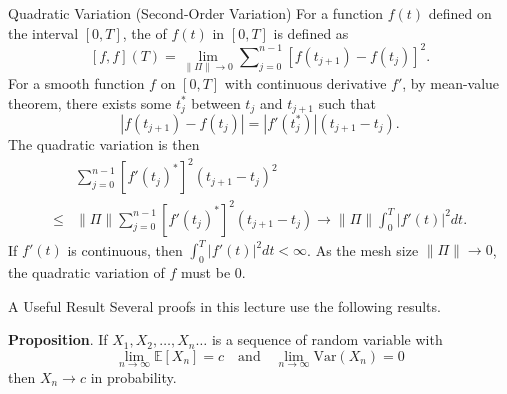 \documentclass[letterpaper,handout]{beamer}
\def\Sum{\sum\nolimits}
\def\E{\mathbb E}
\def\V{\mathrm{Var}}
\begin{document}


\begin{frame}{Quadratic Variation (Second-Order Variation)}
For a function $f(t)$ defined on the interval $[0,T]$, the  of $f(t)$ in $[0,T]$ is defined as
$$[f,f](T)=\lim_{\|\Pi\|\to 0}\Sum_{j=0}^{n-1}[f(t_{j+1})-f(t_j)]^2.$$
For a smooth function $f$ on $[0, T]$ with continuous derivative $f'$,
by mean-value theorem, there exists
some $t_j^*$ between $t_j$ and $t_{j+1}$ such that
$$|f(t_{j+1})-f(t_j)|= |f'(t_j^*)|(t_{j+1}-t_j).$$
The quadratic variation is then
\begin{align*}
&\Sum_{j=0}^{n-1}[f'(t_j)^*]^2(t_{j+1}-t_j)^2\\
\le{}& \|\Pi\|\Sum_{j=0}^{n-1}[f'(t_j)^*]^2(t_{j+1}-t_j)\to\|\Pi\|\int_0^T |f'(t)|^2dt.
\end{align*}
If $f'(t)$ is continuous, then $\int_0^T |f'(t)|^2dt<\infty$.
As the mesh size $\|\Pi\|\to 0$, the quadratic variation of $f$ must be 0.
\end{frame}
\begin{frame}{A Useful Result}
Several proofs in this lecture use the following results.\par\medskip

{\bf Proposition}. If $X_1, X_2,\ldots,X_n\ldots$ is a sequence of random variable with
$$
\lim_{n\to\infty}\E[X_n]=c\quad \text{and}\quad \lim_{n\to\infty}\V(X_n)=0
$$
then $X_n\to c$ in probability.
\vspace{1.5in}

\end{frame}
\end{document}
